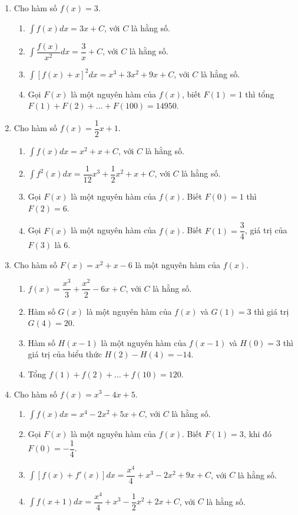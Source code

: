 \documentclass[12pt]{article}
\begin{document}
\begin{enumerate}[label=\textbf{Câu \arabic*.}, start=1]
		\item Cho hàm số $f(x) = 3$.
		\begin{enumerate}[label=\alph*)]
			\item $\displaystyle \int f(x) dx = 3x + C$, với $C$ là hằng số.
			\item $\displaystyle \int \dfrac{f(x)}{x^2} dx = \dfrac{3}{x} + C$, với $C$ là hằng số.
			\item $\displaystyle \int [f(x) + x]^2 dx = x^3 + 3x^2 + 9x + C$, với $C$ là hằng số.
			\item Gọi $F(x)$ là một nguyên hàm của $f(x)$, biết $F(1) = 1$ thì tổng $F(1) + F(2) + \dots + F(100) = 14950$.
		\end{enumerate}
		
		\item Cho hàm số $f(x) = \dfrac{1}{2}x + 1$.
		\begin{enumerate}[label=\alph*)]
			\item $\displaystyle \int f(x) dx = x^2 + x + C$, với $C$ là hằng số.
			\item $\displaystyle \int f^2(x) dx = \dfrac{1}{12}x^3 + \dfrac{1}{2}x^2 + x + C$, với $C$ là hằng số.
			\item Gọi $F(x)$ là một nguyên hàm của $f(x)$. Biết $F(0) = 1$ thì $F(2) = 6$.
			\item Gọi $F(x)$ là một nguyên hàm của $f(x)$. Biết $F(1) = \dfrac{3}{4}$, giá trị của $F(3)$ là $6$.
		\end{enumerate}
		
		\item Cho hàm số $F(x) = x^2 + x - 6$ là một nguyên hàm của $f(x)$.
		\begin{enumerate}[label=\alph*)]
			\item $f(x) = \dfrac{x^3}{3} + \dfrac{x^2}{2} - 6x + C$, với $C$ là hằng số.
			\item Hàm số $G(x)$ là một nguyên hàm của $f(x)$ và $G(1) = 3$ thì giá trị $G(4) = 20$.
			\item Hàm số $H(x-1)$ là một nguyên hàm của $f(x-1)$ và $H(0) = 3$ thì giá trị của biểu thức $H(2) - H(4) = -14$.
			\item Tổng $f(1) + f(2) + \dots + f(10) = 120$.
		\end{enumerate}
		
		\item Cho hàm số $f(x) = x^3 - 4x + 5$.
		\begin{enumerate}[label=\alph*)]
			\item $\displaystyle \int f(x) dx = x^4 - 2x^2 + 5x + C$, với $C$ là hằng số.
			\item Gọi $F(x)$ là một nguyên hàm của $f(x)$. Biết $F(1) = 3$, khi đó $F(0) = -\dfrac{1}{4}$.
			\item $\displaystyle \int [f(x) + f'(x)] dx = \dfrac{x^4}{4} + x^3 - 2x^2 + 9x + C$, với $C$ là hằng số.
			\item $\displaystyle \int f(x+1) dx = \dfrac{x^4}{4} + x^3 - \dfrac{1}{2}x^2 + 2x + C$, với $C$ là hằng số.
		\end{enumerate}
		

\end{enumerate}
\end{document}
